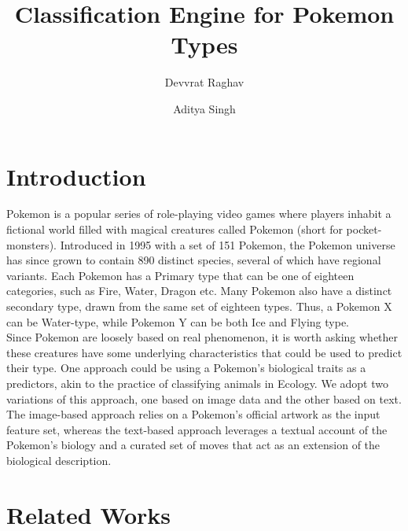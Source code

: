 \documentclass{winnower}
\begin{document}
\title{Classification Engine for Pokemon Types}

\author{Devvrat Raghav}
\author{Aditya Singh}

\date{}

\maketitle

\begin{abstract}

\end{abstract}


\section{Introduction}

Pokemon is a popular series of role-playing video games where players inhabit a fictional world filled with magical creatures called Pokemon (short for pocket-monsters). Introduced in 1995 with a set of 151 Pokemon, the Pokemon universe has since grown to contain 890 distinct species, several of which have regional variants. Each Pokemon has a Primary type that can be one of eighteen categories, such as Fire, Water, Dragon etc. Many Pokemon also have a distinct secondary type, drawn from the same set of eighteen types. Thus, a Pokemon X can be Water-type, while Pokemon Y can be both Ice and Flying type. \\



Since Pokemon are loosely based on real phenomenon, it is worth asking whether these creatures have some underlying characteristics that could be used to predict their type. One approach could be using a Pokemon's biological traits as a predictors, akin to the practice of classifying animals in Ecology. We adopt two variations of this approach, one based on image data and the other based on text. The image-based approach relies on a Pokemon's official artwork as the input feature set, whereas the text-based approach leverages a textual account of the Pokemon's biology and a curated set of moves that act as an extension of the biological description.



\section{Related Works}
\end{document}
